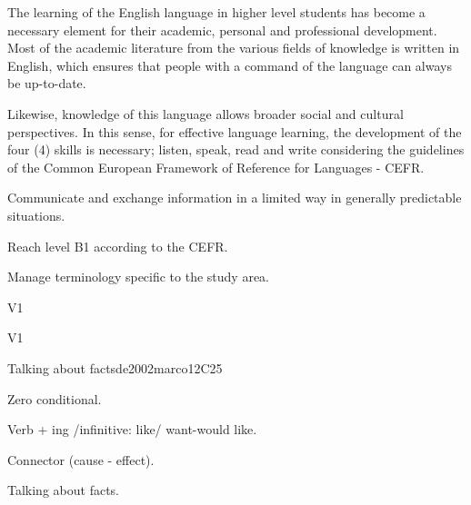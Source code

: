 \begin{syllabus}


\begin{justification}
The learning of the English language in higher level students has become a necessary 
element for their academic, personal and professional development.
Most of the academic literature from the various fields of knowledge is written in English, 
which ensures that people with a command of the language can always be up-to-date.

Likewise, knowledge of this language allows broader social and cultural perspectives. 
In this sense, for effective language learning, the development of the four (4) 
skills is necessary; listen, speak, read and write considering the guidelines of the 
Common European Framework of Reference for Languages - CEFR.
\end{justification}

\begin{goals}
\item Communicate and exchange information in a limited way in 
      generally predictable situations.
\item Reach level B1 according to the CEFR.
\item Manage terminology specific to the study area.
\end{goals}

\begin{outcomes}{V1}
\item {}
\end{outcomes}

\begin{competences}{V1}
\item {}
\end{competences}

\begin{unit}{Talking about facts}{}{de2002marco}{12}{C25}
   \begin{topics}
      \item Zero conditional.
      \item Verb + ing /infinitive: like/ want-would like.
      \item Connector (cause - effect).
   \end{topics}

   \begin{learningoutcomes}
      \item Talking about facts.
   \end{learningoutcomes}
\end{unit}


\end{syllabus}
